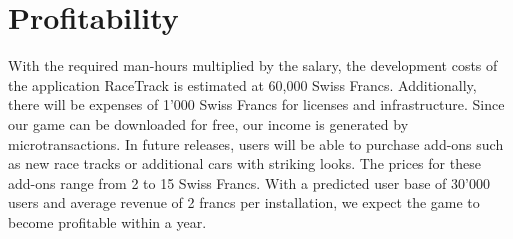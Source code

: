 \section{Profitability}
	With the required man-hours multiplied by the salary, the development costs of the application RaceTrack is estimated at 60,000 Swiss Francs. Additionally, there will be expenses of 1'000 Swiss Francs for licenses and infrastructure. Since our game can be downloaded for free, our income is generated by \gls{microtransactions}. In future releases, users will be able to purchase \gls{add-ons} such as new race tracks or additional cars with striking looks. The prices for these \gls{add-ons} range from 2 to 15 Swiss Francs. With a predicted user base of 30'000 users and average revenue of 2 francs per installation, we expect the game to become profitable within a year.